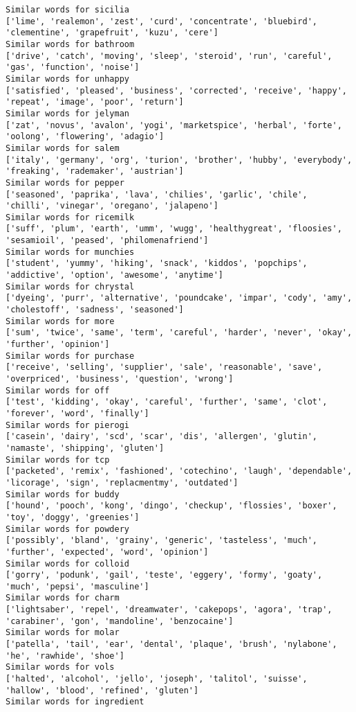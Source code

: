 \documentclass[11pt]{article}
\begin{document}
\begin{Verbatim}[commandchars=\\\{\}]
Similar words for sicilia
['lime', 'realemon', 'zest', 'curd', 'concentrate', 'bluebird', 'clementine', 'grapefruit', 'kuzu', 'cere']
Similar words for bathroom
['drive', 'catch', 'moving', 'sleep', 'steroid', 'run', 'careful', 'gas', 'function', 'noise']
Similar words for unhappy
['satisfied', 'pleased', 'business', 'corrected', 'receive', 'happy', 'repeat', 'image', 'poor', 'return']
Similar words for jelyman
['zat', 'novus', 'avalon', 'yogi', 'marketspice', 'herbal', 'forte', 'oolong', 'flowering', 'adagio']
Similar words for salem
['italy', 'germany', 'org', 'turion', 'brother', 'hubby', 'everybody', 'freaking', 'rademaker', 'austrian']
Similar words for pepper
['seasoned', 'paprika', 'lava', 'chilies', 'garlic', 'chile', 'chilli', 'vinegar', 'oregano', 'jalapeno']
Similar words for ricemilk
['suff', 'plum', 'earth', 'umm', 'wugg', 'healthygreat', 'floosies', 'sesamioil', 'peased', 'philomenafriend']
Similar words for munchies
['student', 'yummy', 'hiking', 'snack', 'kiddos', 'popchips', 'addictive', 'option', 'awesome', 'anytime']
Similar words for chrystal
['dyeing', 'purr', 'alternative', 'poundcake', 'impar', 'cody', 'amy', 'cholestoff', 'sadness', 'seasoned']
Similar words for more
['sum', 'twice', 'same', 'term', 'careful', 'harder', 'never', 'okay', 'further', 'opinion']
Similar words for purchase
['receive', 'selling', 'supplier', 'sale', 'reasonable', 'save', 'overpriced', 'business', 'question', 'wrong']
Similar words for off
['test', 'kidding', 'okay', 'careful', 'further', 'same', 'clot', 'forever', 'word', 'finally']
Similar words for pierogi
['casein', 'dairy', 'scd', 'scar', 'dis', 'allergen', 'glutin', 'namaste', 'shipping', 'gluten']
Similar words for tcp
['packeted', 'remix', 'fashioned', 'cotechino', 'laugh', 'dependable', 'licorage', 'sign', 'replacmentmy', 'outdated']
Similar words for buddy
['hound', 'pooch', 'kong', 'dingo', 'checkup', 'flossies', 'boxer', 'toy', 'doggy', 'greenies']
Similar words for powdery
['possibly', 'bland', 'grainy', 'generic', 'tasteless', 'much', 'further', 'expected', 'word', 'opinion']
Similar words for colloid
['gorry', 'podunk', 'gail', 'teste', 'eggery', 'formy', 'goaty', 'much', 'pepsi', 'masculine']
Similar words for charm
['lightsaber', 'repel', 'dreamwater', 'cakepops', 'agora', 'trap', 'carabiner', 'gon', 'mandoline', 'benzocaine']
Similar words for molar
['patella', 'tail', 'ear', 'dental', 'plaque', 'brush', 'nylabone', 'he', 'rawhide', 'shoe']
Similar words for vols
['halted', 'alcohol', 'jello', 'joseph', 'talitol', 'suisse', 'hallow', 'blood', 'refined', 'gluten']
Similar words for ingredient

\end{Verbatim}
\end{document}
